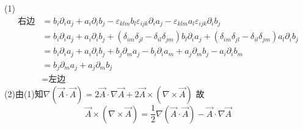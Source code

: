 \documentclass{phyasgn}
\begin{document}
\begin{sol}[1]
    (1)\begin{align*}
        \text{右边}&=b_i\partial _ia_j+a_i\partial _ib_j-\varepsilon_{klm}b_l\varepsilon_{ijk}\partial _ia_j-\varepsilon_{klm}a_l\varepsilon_{ijk}\partial _ib_j\\
        &=b_i\partial _ia_j+a_i\partial _ib_j+(\delta_{im}\delta_{jl}-\delta_{il}\delta_{jm})b_l\partial _ia_j+(\delta_{im}\delta_{jl}-\delta_{il}\delta_{jm})a_l\partial _ib_j\\
        &=b_i\partial _ia_j+a_i\partial _ib_j+b_j\partial _ma_j-b_i\partial _ia_m+a_j\partial _mb_j-a_i\partial _ib_m\\
        &=b_j\partial _ma_j+a_j\partial _mb_j\\
        &=\text{左边}
    \end{align*}
    (2)由(1)知$\nabla(\vec{A}\cdot\vec{A})=2\vec{A}\cdot\nabla\vec{A}+2\vec{A}\times(\nabla\times\vec{A})$
故
$$\vec{A}\times(\nabla\times\vec{A})=\frac{1}{2}\nabla(\vec{A}\cdot\vec{A})-\vec{A}\cdot\nabla\vec{A}$$
\end{sol}\par
\end{document}
